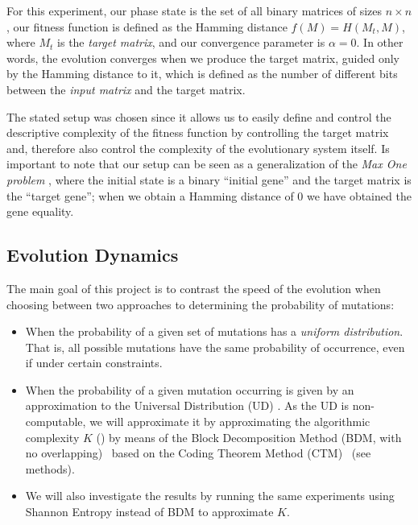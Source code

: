 \documentclass[10pt]{article}
\begin{document}
For this experiment, our phase state is the set of all binary matrices of sizes $n \times n$, our fitness function is defined as the Hamming distance $f(M)=H(M_t,M)$, where $M_t$ is the \textit{target matrix}, and our convergence parameter is $\alpha = 0$. In other words, the evolution converges when we produce the target matrix, guided only by the Hamming distance to it, which is defined as the number of different bits between the \textit{input matrix} and the target matrix.

The stated setup was chosen since it allows us to easily define and control the descriptive complexity of the fitness function by controlling the target matrix and, therefore also control the complexity of the evolutionary system itself. Is important to note that our setup can be seen as a generalization of the \textit{Max One problem} \cite{SE91}, where the initial state is a binary ``initial gene'' and the target matrix is the ``target gene''; when we obtain a Hamming distance of 0 we have obtained the gene equality.

\subsection{Evolution Dynamics}\label{dynamics}

The main goal of this project is to contrast the speed of the evolution when choosing between two approaches to determining the probability of mutations:
\begin{itemize}
\item When the probability of a given set of mutations has a \textit{uniform distribution}. That is, all possible mutations have the same probability of occurrence, even if under certain constraints.
\item When the probability of a given mutation occurring is given by an approximation to the Universal Distribution (UD) \cite{levin,kirchherr1997miraculous}. As the UD is  non-computable, we will approximate it by approximating the algorithmic complexity $K$ (\cite{Kolmogorov,Chaitin74}) by means of the Block Decomposition Method (BDM, with no overlapping)~\cite{zenil2016decomposition} based on the Coding Theorem Method (CTM)~\cite{zenil3,zenil4,Zenil14} (see methods).
\item We will also investigate the results by running the same experiments using Shannon Entropy instead of BDM to approximate $K$.
\end{itemize}
\end{document}
